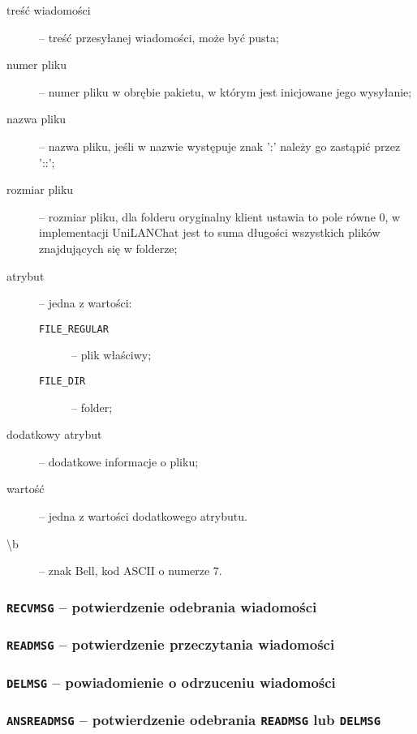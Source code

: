 \documentclass[11pt,leqno]{article}
\begin{document}
\begin{description}
	\item[treść wiadomości] -- treść przesyłanej wiadomości, może być pusta;
	\item[numer pliku] -- numer pliku w obrębie pakietu, w którym jest inicjowane
	jego wysyłanie;
	\item[nazwa pliku] -- nazwa pliku, jeśli w nazwie występuje znak ':' należy go zastąpić przez '::';
	\item[rozmiar pliku] -- rozmiar pliku, dla folderu oryginalny klient ustawia
	to pole równe 0, w implementacji UniLANChat jest to suma długości wszystkich
	plików znajdujących się w folderze;
	\item[atrybut] -- jedna z wartości:
	\begin{description}
		\item[\textnormal{\texttt{FILE\_REGULAR}}] -- plik właściwy;
		\item[\textnormal{\texttt{FILE\_DIR}}] -- folder;
	\end{description}
	\item[dodatkowy atrybut] -- dodatkowe informacje o pliku;
	\item[wartość] -- jedna z wartości dodatkowego atrybutu.
	\item[\textbackslash b] -- znak Bell, kod ASCII o numerze 7.
\end{description}



\subsubsection{\textnormal{\texttt{RECVMSG}} -- potwierdzenie odebrania wiadomości}
\subsubsection{\textnormal{\texttt{READMSG}} -- potwierdzenie przeczytania wiadomości}
\subsubsection{\textnormal{\texttt{DELMSG}} -- powiadomienie o odrzuceniu wiadomości}
\subsubsection{\textnormal{\texttt{ANSREADMSG}} -- potwierdzenie odebrania \textnormal{\texttt{READMSG}} lub \textnormal{\texttt{DELMSG}}}

\end{document}

